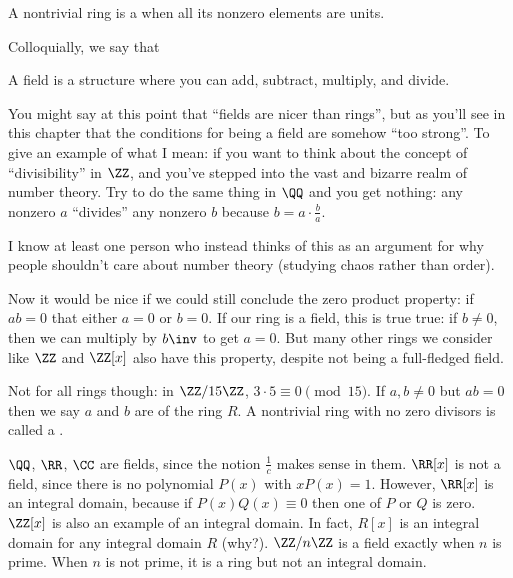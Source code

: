 \begin{definition}
	A nontrivial ring is a 
	when all its nonzero elements are units.
\end{definition}

Colloquially, we say that
\begin{moral}
A field is a structure where you can add, subtract, multiply, and divide.
\end{moral}

\begin{remark}
	You might say at this point that ``fields are nicer than rings'',
	but as you'll see in this chapter that the conditions for
	being a field are somehow ``too strong''.
	To give an example of what I mean:
	if you want to think about the concept of ``divisibility''
	in $\ZZ$, and you've stepped into the vast and bizarre realm of
	number theory.  Try to do the same thing in $\QQ$ and you get nothing:
	any nonzero $a$ ``divides'' any nonzero $b$
	because $b = a \cdot \frac ba$.

	I know at least one person who instead
	thinks of this as an argument for why people
	shouldn't care about number theory
	(studying chaos rather than order).
\end{remark}

Now it would be nice if we could still conclude the zero product property:
if $ab = 0$ that either $a = 0$ or $b = 0$.
If our ring is a field, this is true true: if $b \neq 0$,
then we can multiply by $b\inv$ to get $a = 0$.
But many other rings we consider like $\ZZ$ and $\ZZ[x]$ also have this property,
despite not being a full-fledged field.

Not for all rings though: in $\ZZ/15\ZZ$, $3 \cdot 5 \equiv 0 \pmod{15}$.
If $a, b \neq 0$ but $ab=0$ then we say $a$ and $b$ are 
of the ring $R$.
A nontrivial ring with no zero divisors is called a .

\begin{example}
	\listhack
	\begin{enumerate}[(a)]
		\ii $\QQ$, $\RR$, $\CC$ are fields, since the notion $\frac 1c$ makes sense in them.
		\ii $\RR[x]$ is not a field, since there is no polynomial $P(x)$ with $xP(x) = 1$.
		However, $\RR[x]$ is an integral domain, because if $P(x) Q(x) \equiv 0$ then one
		of $P$ or $Q$ is zero.
		\ii $\ZZ[x]$ is also an example of an integral domain.
		In fact, $R[x]$ is an integral domain for any integral domain $R$ (why?).
		\ii $\ZZ/n\ZZ$ is a field exactly when $n$ is prime.
		When $n$ is not prime, it is a ring but not an integral domain.
	\end{enumerate}
\end{example}

